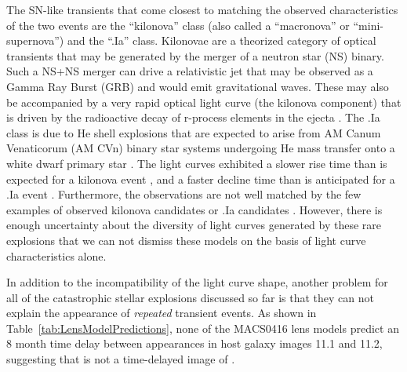 The SN-like transients that come closest to matching the observed
characteristics of the two \spock events are the ``kilonova'' class
(also called a ``macronova'' or ``mini-supernova'') and the ``.Ia''
class.  Kilonovae are a theorized category of optical transients that
may be generated by the merger of a neutron star (NS) binary. Such a
NS+NS merger can drive a relativistic jet that may be observed as a
Gamma Ray Burst (GRB) and would emit gravitational waves.  These may
also be accompanied by a very rapid optical light curve (the kilonova
component) that is driven by the radioactive decay of r-process
elements in the ejecta \citep{Li:1998,Kulkarni:2005}.  The .Ia class
is due to He shell explosions that are expected to arise from AM Canum
Venaticorum (AM CVn) binary star systems undergoing He mass transfer
onto a white dwarf primary star \citep{Warner:1995,
  Nelemans:2005,Bildsten:2007}.  The \spock light curves exhibited a
slower rise time than is expected for a kilonova event
\citep[e.g.,][]{Metzger:2010,Barnes:2013,Kasen:2015}, and a faster
decline time than is anticipated for a .Ia event
\citep[e.g.,][]{Shen:2010}.  Furthermore, the \spock observations are not
well matched by the few examples of observed kilonova candidates
\citep{Perley:2009,Tanvir:2013} or .Ia candidates
\citep{Kasliwal:2010, Perets:2010, Poznanski:2010}.  However, there is
enough uncertainty about the diversity of light curves generated by
these rare explosions that we can not dismiss these models on the
basis of light curve characteristics alone.

In addition to the incompatibility of the light curve shape, another
problem for all of the catastrophic stellar explosions discussed so
far is that they can not explain the appearance of {\it repeated}
transient events.  As shown in Table~\ref{tab:LensModelPredictions}, none of
the MACS0416 lens models predict an 8 month time delay between
appearances in host galaxy images 11.1 and 11.2, suggesting that
\spocktwo is not a time-delayed image of \spockone \citep[as was the
  case for the 5th image of SN Refsdal][]{Kelly:2015a,Kelly:2016}.

